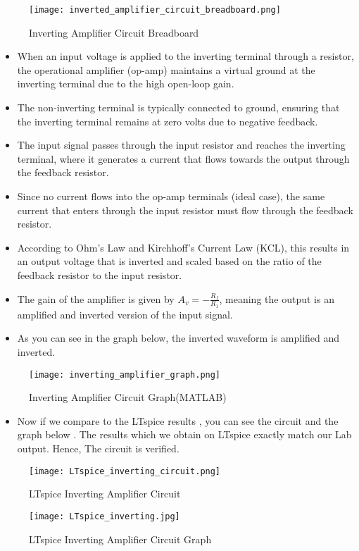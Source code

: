 \documentclass[9pt,conference]{IEEEtran}
\begin{document}
\begin{figure}[H]
    \centering
    \texttt{[image: inverted\_amplifier\_circuit\_breadboard.png]}
    \caption{Inverting Amplifier Circuit Breadboard}
    \label{fig:positive_clamper}
\end{figure}
\begin{itemize}
    \item When an input voltage is applied to the inverting terminal through a resistor, the operational amplifier (op-amp) maintains a virtual ground at the inverting terminal due to the high open-loop gain.
    \item The non-inverting terminal is typically connected to ground, ensuring that the inverting terminal remains at zero volts due to negative feedback.
    \item The input signal passes through the input resistor and reaches the inverting terminal, where it generates a current that flows towards the output through the feedback resistor.
    \item Since no current flows into the op-amp terminals (ideal case), the same current that enters through the input resistor must flow through the feedback resistor.
    \item According to Ohm's Law and Kirchhoff's Current Law (KCL), this results in an output voltage that is inverted and scaled based on the ratio of the feedback resistor to the input resistor.
    \item The gain of the amplifier is given by \( A_v = -\frac{R_f}{R_{1}} \), meaning the output is an amplified and inverted version of the input signal.
    \item As you can see in the graph below, the inverted waveform is amplified and inverted.
\end{itemize}

\begin{figure}[H]
    \centering
    \texttt{[image: inverting\_amplifier\_graph.png]}
    \caption{Inverting Amplifier Circuit Graph(MATLAB)}
    \label{fig:positive_clamper}
\end{figure}

\begin{itemize}
    \item Now if we compare to the LTspice results , you can see the circuit and the graph below . The results which we obtain on LTspice exactly match our Lab output. Hence, The circuit is verified.
\end{itemize}
\begin{figure}[H]
    \centering
    \texttt{[image: LTspice\_inverting\_circuit.png]}
    \caption{LTspice Inverting Amplifier Circuit}
    \label{fig:positive_clamper}
\end{figure}
\begin{figure}[H]
    \centering
    \texttt{[image: LTspice\_inverting.jpg]}
    \caption{LTspice Inverting Amplifier Circuit Graph}
    \label{fig:positive_clamper}
\end{figure}
\end{document}
